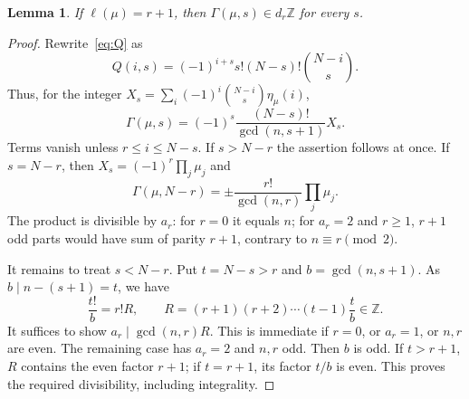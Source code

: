 \documentclass[11pt]{article}
\newtheorem{lemma}[theorem]{Lemma}
\theoremstyle{remark}
\newcommand{\Z}{\mathbb{Z}}
\begin{document}
\begin{lemma}\label{lem:C}
If $\ell(\mu)=r+1$, then $\Gamma(\mu,s)\in d_r\Z$ for every $s$.
\end{lemma}
\begin{proof}
Rewrite~\eqref{eq:Q} as
\[
 Q(i,s)=(-1)^{i+s}s!(N-s)!\binom{N-i}s.
\]
Thus, for the integer
$X_s=\sum_i(-1)^i\binom{N-i}s\eta_\mu(i)$,
\begin{equation}\label{eq:gamma}
 \Gamma(\mu,s)=(-1)^s\frac{(N-s)!}{\gcd(n,s+1)}X_s.
\end{equation}
Terms vanish unless $r\leq i\leq N-s$. If $s>N-r$ the assertion
follows at once. If $s=N-r$, then $X_s=(-1)^r\prod_j\mu_j$ and
\[
 \Gamma(\mu,N-r)=\pm\frac{r!}{\gcd(n,r)}\prod_j\mu_j.
\]
The product is divisible by $a_r$: for $r=0$ it equals $n$;
for $a_r=2$ and $r\geq1$, $r+1$ odd parts would have sum of
parity $r+1$, contrary to $n\equiv r\pmod2$.

It remains to treat $s<N-r$. Put $t=N-s>r$ and $b=\gcd(n,s+1)$.
As $b\mid n-(s+1)=t$, we have
\[
 \frac{t!}{b}=r!R,\qquad
 R=(r+1)(r+2)\cdots(t-1)\frac tb\in\Z.
\]
It suffices to show $a_r\mid\gcd(n,r)R$. This is immediate if
$r=0$, or $a_r=1$, or $n,r$ are even. The remaining case has
$a_r=2$ and $n,r$ odd. Then $b$ is odd. If $t>r+1$, $R$ contains
the even factor $r+1$; if $t=r+1$, its factor $t/b$ is even.
This proves the required divisibility, including integrality.
\end{proof}
\end{document}
